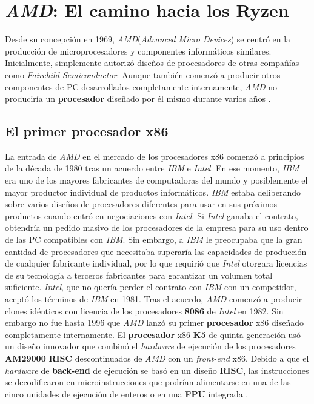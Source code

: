 \section{\emph{AMD}: El camino hacia los \textbf{Ryzen}}
Desde su concepción en 1969, \emph{AMD}(\emph{Advanced Micro Devices}) se centró en la producción de microprocesadores y componentes informáticos similares. Inicialmente,
simplemente autorizó diseños de procesadores de otras compañías como \emph{Fairchild Semiconductor}. Aunque también comenzó a producir otros componentes de PC desarrollados
completamente internamente, \emph{AMD} no produciría un \textbf{procesador} diseñado por él mismo durante varios años . 

\subsection{El primer \textbf{procesador} x86}
La entrada de \emph{AMD} en el mercado de los procesadores x86 comenzó a principios de la década de 1980 tras un acuerdo entre \emph{IBM} e \emph{Intel}. En ese momento, \emph{IBM}
era uno de los mayores fabricantes de computadoras del mundo y posiblemente el mayor productor individual de productos informáticos. \emph{IBM} estaba deliberando sobre varios diseños
de procesadores diferentes para usar en sus próximos productos cuando entró en negociaciones con \emph{Intel}. Si \emph{Intel} ganaba el contrato, obtendría un pedido masivo de los
procesadores de la empresa para su uso dentro de las PC compatibles con \emph{IBM}. Sin embargo, a \emph{IBM} le preocupaba que la gran cantidad de procesadores que necesitaba
superaría las capacidades de producción de cualquier fabricante individual, por lo que requirió que \emph{Intel} otorgara licencias de su tecnología a terceros fabricantes
para garantizar un volumen total suficiente. \emph{Intel}, que no quería perder el contrato con \emph{IBM} con un competidor, aceptó los términos de \emph{IBM} en 1981. Tras el acuerdo,
\emph{AMD} comenzó a producir clones idénticos con licencia de los procesadores \textbf{8086} de \emph{Intel} en 1982. Sin embargo no fue hasta 1996 que \emph{AMD} lanzó su primer
\textbf{procesador} x86 diseñado completamente internamente. El \textbf{procesador} x86 \textbf{K5} de quinta generación usó un diseño innovador que combinó el \emph{hardware} de
ejecución de los procesadores \textbf{AM29000} \textbf{RISC} descontinuados de \emph{AMD} con un \emph{front-end} x86. Debido a que el \emph{hardware} de \textbf{back-end} de ejecución
se basó en un diseño \textbf {RISC}, las instrucciones se decodificaron en microinstrucciones que podrían alimentarse en una de las cinco unidades de ejecución de enteros o en una
\textbf{FPU} integrada . 

